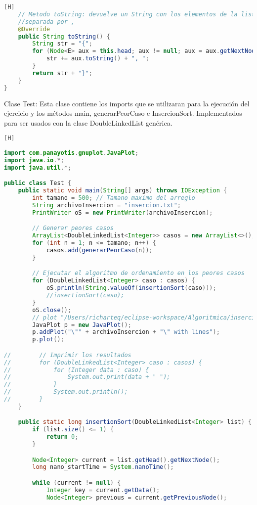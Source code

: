 \begin{enumerate}[{Ejercicio} 1.]
\begin{lstlisting}[language=java, caption={DoubleLinkedList}][H]
    // Metodo toString: devuelve un String con los elementos de la lista enlazada 
    //separada por ,
    @Override
    public String toString() {
        String str = "{";
        for (Node<E> aux = this.head; aux != null; aux = aux.getNextNode()) {
            str += aux.toString() + ", ";
        }
        return str + "}";
    }
}
	\end{lstlisting}
	Clase Test: Esta clase contiene los imports que se utilizaran para la ejecución del ejercicio y los métodos main, generarPeorCaso e InsercionSort. Implementados para ser usados con la clase DoubleLinkedList genérica.
	\begin{lstlisting}[language=java, caption={Test}][H]
		
import com.panayotis.gnuplot.JavaPlot;
import java.io.*;
import java.util.*;

public class Test {
    public static void main(String[] args) throws IOException {
        int tamano = 500; // Tamano maximo del arreglo
        String archivoInsercion = "insercion.txt";
        PrintWriter oS = new PrintWriter(archivoInsercion);

        // Generar peores casos
        ArrayList<DoubleLinkedList<Integer>> casos = new ArrayList<>();
        for (int n = 1; n <= tamano; n++) {
            casos.add(generarPeorCaso(n));
        }

        // Ejecutar el algoritmo de ordenamiento en los peores casos
        for (DoubleLinkedList<Integer> caso : casos) {
            oS.println(String.valueOf(insertionSort(caso)));
            //insertionSort(caso);
        }
        oS.close();
        // plot "/Users/richarteq/eclipse-workspace/Algoritmica/insercion.txt" with lines
        JavaPlot p = new JavaPlot();
        p.addPlot("\"" + archivoInsercion + "\" with lines");
        p.plot();

//        // Imprimir los resultados
//        for (DoubleLinkedList<Integer> caso : casos) {
//            for (Integer data : caso) {
//                System.out.print(data + " ");
//            }
//            System.out.println();
//        }
    }

    public static long insertionSort(DoubleLinkedList<Integer> list) {
        if (list.size() <= 1) {
            return 0;
        }

        Node<Integer> current = list.getHead().getNextNode();
        long nano_startTime = System.nanoTime();

        while (current != null) {
            Integer key = current.getData();
            Node<Integer> previous = current.getPreviousNode();


\end{lstlisting}
\end{enumerate}
